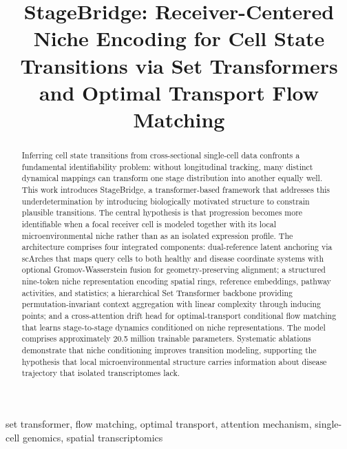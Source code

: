 \documentclass[conference]{IEEEtran}
\begin{document}
\pagestyle{plain}

\title{StageBridge: Receiver-Centered Niche Encoding for Cell State Transitions via Set Transformers and Optimal Transport Flow Matching}

\author{
}

\maketitle

\begin{abstract}
Inferring cell state transitions from cross-sectional single-cell data confronts a fundamental identifiability problem: without longitudinal tracking, many distinct dynamical mappings can transform one stage distribution into another equally well. This work introduces StageBridge, a transformer-based framework that addresses this underdetermination by introducing biologically motivated structure to constrain plausible transitions. The central hypothesis is that progression becomes more identifiable when a focal receiver cell is modeled together with its local microenvironmental niche rather than as an isolated expression profile. The architecture comprises four integrated components: dual-reference latent anchoring via scArches that maps query cells to both healthy and disease coordinate systems with optional Gromov-Wasserstein fusion for geometry-preserving alignment; a structured nine-token niche representation encoding spatial rings, reference embeddings, pathway activities, and statistics; a hierarchical Set Transformer backbone providing permutation-invariant context aggregation with linear complexity through inducing points; and a cross-attention drift head for optimal-transport conditional flow matching that learns stage-to-stage dynamics conditioned on niche representations. The model comprises approximately 20.5 million trainable parameters. Systematic ablations demonstrate that niche conditioning improves transition modeling, supporting the hypothesis that local microenvironmental structure carries information about disease trajectory that isolated transcriptomes lack.
\end{abstract}

\begin{IEEEkeywords}
set transformer, flow matching, optimal transport, attention mechanism, single-cell genomics, spatial transcriptomics
\end{IEEEkeywords}
\end{document}
